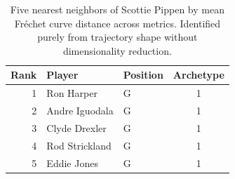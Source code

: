 \begin{table}[htbp]
  \centering\small
  \begin{tabular}{rllc}
    \toprule
    Rank & Player & Position & Archetype \\
    \midrule
    1 & Ron Harper & G & 1 \\
    2 & Andre Iguodala & G & 1 \\
    3 & Clyde Drexler & G & 1 \\
    4 & Rod Strickland & G & 1 \\
    5 & Eddie Jones & G & 1 \\
    \bottomrule
  \end{tabular}
  \caption{Five nearest neighbors of Scottie Pippen by mean Fr\'{e}chet curve distance across metrics. Identified purely from trajectory shape without dimensionality reduction.}
  \label{tab:Scottie_Pippen_frechet_curve_neighbors}
\end{table}

